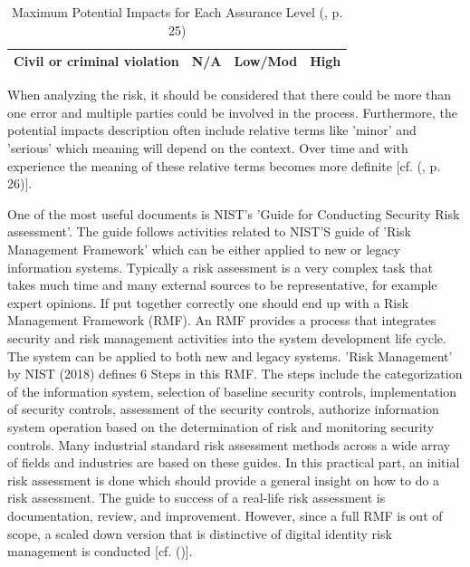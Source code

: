 \begin{table}[h]
\begin{tabular}{lccc}
		\multicolumn{1}{|l|}{Civil or criminal violation}                                                                           & \multicolumn{1}{c|}{N/A}        & \multicolumn{1}{c|}{Low/Mod}    & \multicolumn{1}{c|}{High}       \\ \hline
	\end{tabular}
	\endgroup
	\caption{Maximum Potential Impacts for Each Assurance Level (\cite{NIST:2017:DIG}, p. 25)} \label{tab:maxImpacts}
\end{table}

When analyzing the risk, it should be considered that there could be more than one error and multiple parties could be involved in the process. Furthermore, the potential impacts description often include relative terms like 'minor' and 'serious' which meaning will depend on the context. Over time and with experience the meaning of these relative terms becomes more definite [cf. (\cite{NIST:2017:DIG}, p. 26)].

One of the most useful documents is NIST's 'Guide for Conducting Security Risk assessment'. The guide follows activities related to NIST'S guide of 'Risk Management Framework' which can be either applied to new or legacy information systems. Typically a risk assessment is a very complex task that takes much time and many external sources to be representative, for example expert opinions. If put together correctly one should end up with a Risk Management Framework (RMF). An RMF provides a process that integrates security and risk management activities into the system development life cycle. The system can be applied to both new and legacy systems. 'Risk Management' by NIST (2018) defines 6 Steps in this RMF. The steps include the categorization of the information system, selection of baseline security controls, implementation of security controls, assessment of the security controls, authorize information system operation based on the determination of risk and monitoring security controls. Many industrial standard risk assessment methods across a wide array of fields and industries are based on these guides.  In this practical part, an initial risk assessment is done which should provide a general insight on how to do a risk assessment. The guide to success of a real-life risk assessment is documentation, review, and improvement.  However, since a full RMF is out of scope, a scaled down version that is distinctive of digital identity risk management is conducted  [cf. (\cite{NIST:2018:RMF})].


